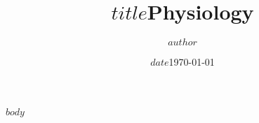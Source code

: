 \documentclass{article}
\author{$author$}
\author{}
\title{$title$}
\title{Physiology}
\date{$date$}
\date{\today}
\begin{document}
\maketitle

$body$

\newpage

\printbibliography
\end{document}
